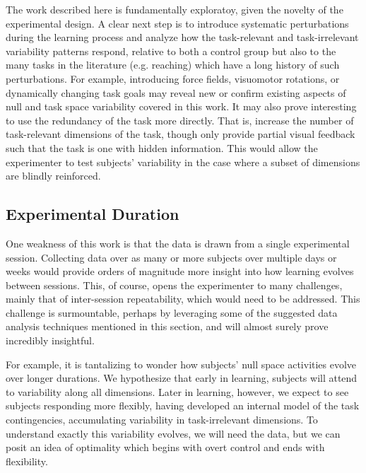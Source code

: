 \documentclass[../main.tex]{subfiles}
\begin{document}
The work described here is fundamentally exploratoy, given the novelty of the experimental design. A clear next step is to introduce systematic perturbations during the learning process and analyze how the task-relevant and task-irrelevant variability patterns respond, relative to both a control group but also to the many tasks in the literature (e.g. reaching) which have a long history of such perturbations. For example, introducing force fields, visuomotor rotations, or dynamically changing task goals may reveal new or confirm existing aspects of null and task space variability covered in this work. It may also prove interesting to use the redundancy of the task more directly. That is, increase the number of task-relevant dimensions of the task, though only provide partial visual feedback such that the task is one with hidden information. This would allow the experimenter to test subjects' variability in the case where a subset of dimensions are blindly reinforced.







\subsection{Experimental Duration}

One weakness of this work is that the data is drawn from a single experimental session. Collecting data over as many or more subjects over multiple days or weeks would provide orders of magnitude more insight into how learning evolves between sessions. This, of course, opens the experimenter to many challenges, mainly that of inter-session repeatability, which would need to be addressed. This challenge is surmountable, perhaps by leveraging some of the suggested data analysis techniques mentioned in this section, and will almost surely prove incredibly insightful.

For example, it is tantalizing to wonder how subjects' null space activities evolve over longer durations. We hypothesize that early in learning, subjects will attend to variability along all dimensions. Later in learning, however, we expect to see subjects responding more flexibly, having developed an internal model of the task contingencies, accumulating variability in task-irrelevant dimensions. To understand exactly this variability evolves, we will need the data, but we can posit an idea of optimality which begins with overt control and ends with flexibility.
\end{document}
